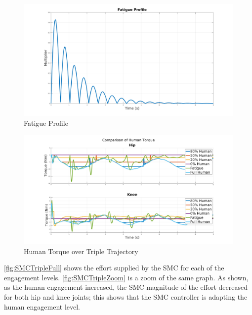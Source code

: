 \begin{figure}
    \centering
    \includegraphics[width=\columnwidth]{images/controllers/gait/fat_profile.png}
    \caption[Fatigue Profile]{Fatigue Profile}
    \label{fig:fatprofile}
\end{figure}


\begin{figure}
    \centering
    \includegraphics[width=\columnwidth]{images/controllers/trajs/human.png}
    \caption[Human Torque over Triple Trajectory]{Human Torque over Triple Trajectory}
    \label{fig:humantripletraj}
\end{figure}


\autoref{fig:SMCTripleFull} shows the effort supplied by the SMC for each of the engagement levels. \autoref{fig:SMCTripleZoom} is a zoom of the same graph. As shown, as the human engagement increased, the SMC magnitude of the effort decreased for both hip and knee joints; this shows that the SMC controller is adapting the human engagement level. 


